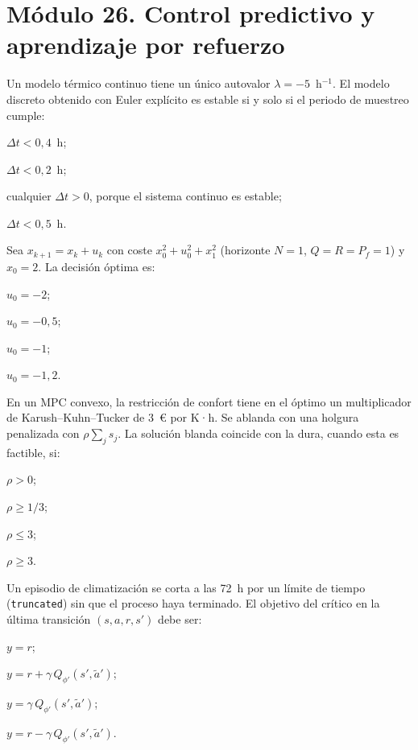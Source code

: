 \section*{Módulo 26. Control predictivo y aprendizaje por refuerzo}

\begin{cuestiones}[resume]
\item {} Un modelo térmico continuo tiene un único autovalor $\lambda=-5$~h$^{-1}$. El modelo discreto obtenido con Euler explícito es estable si y solo si el periodo de muestreo cumple:
\begin{opciones}
  \item $\Delta t<0{,}4$~h;
  \item $\Delta t<0{,}2$~h;
  \item cualquier $\Delta t>0$, porque el sistema continuo es estable;
  \item $\Delta t<0{,}5$~h.
\end{opciones}

\item {} Sea $x_{k+1}=x_k+u_k$ con coste $x_0^{2}+u_0^{2}+x_1^{2}$ (horizonte $N=1$, $Q=R=P_f=1$) y $x_0=2$. La decisión óptima es:
\begin{opciones}
  \item $u_0=-2$;
  \item $u_0=-0{,}5$;
  \item $u_0=-1$;
  \item $u_0=-1{,}2$.
\end{opciones}

\item {} En un MPC convexo, la restricción de confort tiene en el óptimo un multiplicador de Karush--Kuhn--Tucker de 3~€ por K·h. Se ablanda con una holgura penalizada con $\rho\sum_j s_j$. La solución blanda coincide con la dura, cuando esta es factible, si:
\begin{opciones}
  \item $\rho>0$;
  \item $\rho\ge 1/3$;
  \item $\rho\le 3$;
  \item $\rho\ge 3$.
\end{opciones}

\item {} Un episodio de climatización se corta a las 72~h por un límite de tiempo (\texttt{truncated}) sin que el proceso haya terminado. El objetivo del crítico en la última transición $(s,a,r,s')$ debe ser:
\begin{opciones}
  \item $y=r$;
  \item $y=r+\gamma\,Q_{\phi'}(s',\tilde a')$;
  \item $y=\gamma\,Q_{\phi'}(s',\tilde a')$;
  \item $y=r-\gamma\,Q_{\phi'}(s',\tilde a')$.
\end{opciones}
\end{cuestiones}

